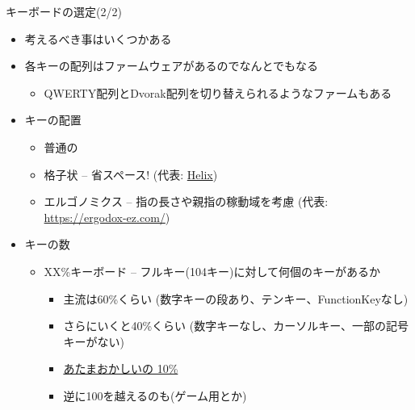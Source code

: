 \documentclass[cjk,dvipdfmx,10pt,compress,fragile%
hyperref={bookmarks=true,bookmarksnumbered=true,bookmarksopen=false,%
colorlinks=false,%
pdftitle={第 134 回 関西 Debian 勉強会},%
pdfauthor={小林},%
pdfsubject={資料},%
}]{beamer}
\begin{document}
\begin{frame}[fragile,t]{キーボードの選定(2/2)}
 \begin{itemize}
  \item 考えるべき事はいくつかある
  \item 各キーの配列はファームウェアがあるのでなんとでもなる
	\begin{itemize}
	 \item QWERTY配列とDvorak配列を切り替えられるようなファームもある
	\end{itemize}
  \item キーの配置
	\begin{itemize}
	 \item 普通の
	 \item 格子状 -- 省スペース! (代表: \href{https://yushakobo.jp/shop/helix-keyboard-kit/}{Helix})
	 \item エルゴノミクス -- 指の長さや親指の稼動域を考慮 (代表: \href{ErgoDox}{https://ergodox-ez.com/})
	\end{itemize}
  \item キーの数
	\begin{itemize}
	 \item XX\%キーボード -- フルキー(104キー)に対して何個のキーがあるか
	       \begin{itemize}
		\item 主流は60\%くらい (数字キーの段あり、テンキー、FunctionKeyなし)
		\item さらにいくと40\%くらい (数字キーなし、カーソルキー、一部の記号キーがない)
		\item \href{https://www.reddit.com/r/MechanicalKeyboards/comments/dnrvz8/science_isnt_about_why_its_about_why_not/}{あたまおかしいの 10\%}
		\item 逆に100を越えるのも(ゲーム用とか)
	       \end{itemize}
	\end{itemize}
 \end{itemize}
\end{frame}
\end{document}
